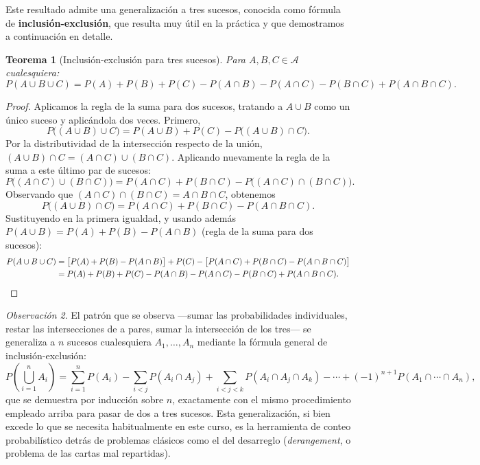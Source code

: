 \documentclass[11pt,a4paper]{article}
\theoremstyle{plain}
\newtheorem{teorema}{Teorema}[section]
\theoremstyle{definition}
\theoremstyle{remark}
\newtheorem{observacion}[teorema]{Observación}
\begin{document}
Este resultado admite una generalización a tres sucesos, conocida como fórmula de \textbf{inclusión-exclusión}, que resulta muy útil en la práctica y que demostramos a continuación en detalle.

\begin{teorema}[Inclusión-exclusión para tres sucesos]
Para $A,B,C \in \mathcal{A}$ cualesquiera:
\[
P(A\cup B\cup C) = P(A)+P(B)+P(C) - P(A\cap B) - P(A\cap C) - P(B\cap C) + P(A\cap B\cap C).
\]
\end{teorema}

\begin{proof}
Aplicamos la regla de la suma para dos sucesos, tratando a $A\cup B$ como un único suceso y aplicándola dos veces. Primero,
\[
P\big((A\cup B)\cup C\big) = P(A\cup B) + P(C) - P\big((A\cup B)\cap C\big).
\]
Por la distributividad de la intersección respecto de la unión, $(A\cup B)\cap C = (A\cap C)\cup(B\cap C)$. Aplicando nuevamente la regla de la suma a este último par de sucesos:
\[
P\big((A\cap C)\cup(B\cap C)\big) = P(A\cap C)+P(B\cap C) - P\big((A\cap C)\cap(B\cap C)\big).
\]
Observando que $(A\cap C)\cap(B\cap C) = A\cap B\cap C$, obtenemos
\[
P\big((A\cup B)\cap C\big) = P(A\cap C)+P(B\cap C) - P(A\cap B\cap C).
\]
Sustituyendo en la primera igualdad, y usando además $P(A\cup B) = P(A)+P(B)-P(A\cap B)$ (regla de la suma para dos sucesos):
\begin{align*}
P(A\cup B\cup C) &= \big[P(A)+P(B)-P(A\cap B)\big] + P(C) - \big[P(A\cap C)+P(B\cap C) - P(A\cap B\cap C)\big] \\
&= P(A)+P(B)+P(C) - P(A\cap B) - P(A\cap C) - P(B\cap C) + P(A\cap B\cap C). \qedhere
\end{align*}
\end{proof}

\begin{observacion}
El patrón que se observa —sumar las probabilidades individuales, restar las intersecciones de a pares, sumar la intersección de los tres— se generaliza a $n$ sucesos cualesquiera $A_1,\dots,A_n$ mediante la fórmula general de inclusión-exclusión:
\[
P\left(\bigcup_{i=1}^n A_i\right) = \sum_{i=1}^n P(A_i) - \sum_{i<j} P(A_i\cap A_j) + \sum_{i<j<k} P(A_i\cap A_j\cap A_k) - \cdots + (-1)^{n+1} P(A_1\cap\cdots\cap A_n),
\]
que se demuestra por inducción sobre $n$, exactamente con el mismo procedimiento empleado arriba para pasar de dos a tres sucesos. Esta generalización, si bien excede lo que se necesita habitualmente en este curso, es la herramienta de conteo probabilístico detrás de problemas clásicos como el del desarreglo (\emph{derangement}, o problema de las cartas mal repartidas).
\end{observacion}
\end{document}

